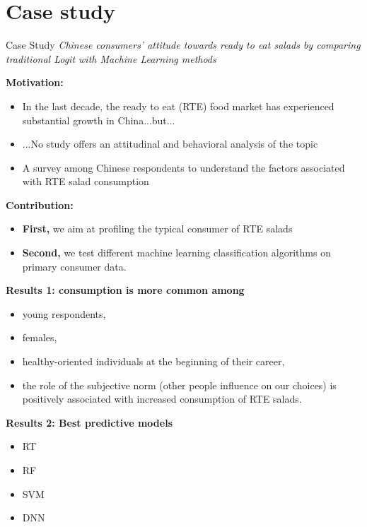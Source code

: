 \documentclass[12pt]{beamer}
\begin{document}
\section{Case study}

\begin{frame}{Case Study}
\textit{Chinese consumers’ attitude towards ready to eat salads by comparing traditional Logit with Machine Learning methods}
\end{frame}

\begin{frame}
	\footnotesize
	\textbf{Motivation:}
	\begin{itemize}
	\item In the last decade, the ready to eat (RTE) food market has experienced substantial growth in China...but...
	\item ...No study offers an attitudinal and behavioral analysis of the topic
	\item A survey among Chinese respondents to understand the factors associated with RTE salad consumption
	\end{itemize}

	\textbf{Contribution:}
	\begin{itemize}
	\item \textbf{First,} we aim at profiling the typical consumer of RTE salads
	\item \textbf{Second,} we test different machine learning classification algorithms on primary consumer data.
	\end{itemize}


 \end{frame}


 \begin{frame}
 	\footnotesize
\textbf{Results 1: consumption is more common among}
\begin{itemize}
	\item young respondents,  
	\item females,
	\item healthy-oriented individuals at the beginning of their career,
	\item the role of the subjective norm (other people influence on our choices) is positively associated with increased consumption of RTE salads. 
\end{itemize}		

\textbf{Results 2: Best predictive models}
\begin{itemize}
	\item RT
	\item RF
	\item SVM
	\item DNN
\end{itemize}		 	
\end{frame}
\end{document}
